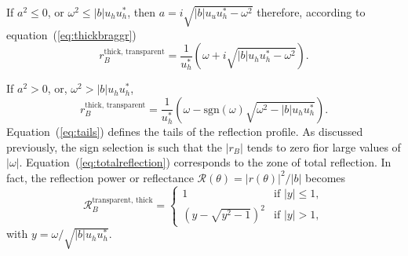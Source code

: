 \documentclass{iucr}
\begin{document}
If $a^2\le0$, or $\omega^2 \le |b|u_h u_h^*$, then $a=i\sqrt{|b|u_u u_h^* - \omega^2}$ therefore, according to equation~(\ref{eq:thickbraggr})
\begin{equation}\label{eq:totalreflection}
    r_B^{\text{thick, transparent}} =
    \frac{1}{u_{h}^*}\left( \omega+i\sqrt{|b|u_h u_h^*-\omega^2} \right).
\end{equation}

If $a^2 > 0$, or, $\omega^2 > |b|u_h u_h^*$,
\begin{equation}\label{eq:tails}
    r_B^{\text{thick, transparent}} =
    \frac{1}{u_{h}^*}\left( \omega-\text{sgn}(\omega)\sqrt{\omega^2-|b|u_h u_h^*} \right).
\end{equation}
Equation~(\ref{eq:tails}) defines the tails of the reflection profile. As discussed previously, the sign selection is such that the $|r_B|$ tends to zero fior large values of $|\omega|$. Equation~(\ref{eq:totalreflection}) corresponds to the zone of total reflection. In fact, the reflection power or reflectance $\mathcal{R} (\theta)=|r(\theta)|^2 / |b|$ becomes
\begin{equation}\label{eq:Darwin}
\mathcal{R}_B^{\text{transparent, thick}} =
    \begin{cases} 
    1
    & \text{if  $|y| \le 1$},\\
    ( y - \sqrt{y^2-1} )^2
    & \text{if $|y|>1$},
    \end{cases}
\end{equation}
with $y=\omega/\sqrt{|b|u_h u_h^*}$. 



\end{document}
